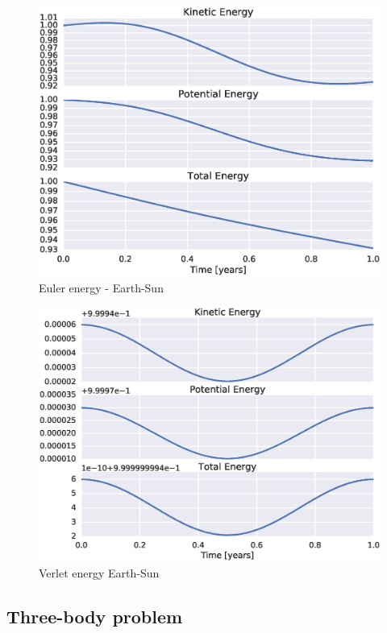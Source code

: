 \documentclass[aps,reprint]{revtex4-1}
\begin{document}
\begin{figure}[H]
  \includegraphics[width=\columnwidth]{figures/energy_euler.eps}
  \caption{Euler energy - Earth-Sun}
  \label{fig:eulerenergy}
\end{figure}

\begin{figure}[H]
  \includegraphics[width=\columnwidth]{figures/energy_verlet.eps}
  \caption{Verlet energy Earth-Sun}
  \label{fig:verletenergy}
\end{figure}
\subsection{Three-body problem}
\end{document}
